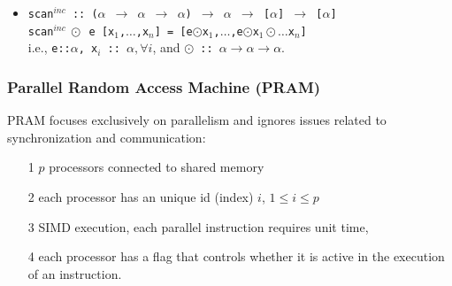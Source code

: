 \documentclass{beamer}
\renewcommand{\emph}[1]{\textcolor{structure}{#1}}
\newcommand{\emp}[1]{\textcolor{DikuRed}{ #1}}
\begin{document}
\begin{frame}[fragile,t]
\begin{itemize}
    \item \emp{{\tt scan$^{inc}$~::~($\alpha$~$\rightarrow$~$\alpha$~$\rightarrow$~$\alpha$)~$\rightarrow$~$\alpha$~$\rightarrow$~[$\alpha$]~$\rightarrow$~[$\alpha$]}}\\
        \emph{\tt scan$^{inc}~\odot$~e~[x$_1$,$\ldots$,x$_n$]~=~[e$\odot$x$_1$,$\ldots$,e$\odot$x$_1\odot\ldots$x$_{n}$]}\\
        i.e., \emp{{\tt{}e::$\alpha$, x$_i$~::~$\alpha, \forall i$}}, and 
        \emp{\tt $\odot$~::~$\alpha\rightarrow\alpha\rightarrow\alpha$}.

\end{itemize}

\end{frame}

\begin{frame}[fragile,t]
  \frametitle{Parallel Random Access Machine (PRAM)}

PRAM focuses exclusively on parallelism and ignores issues
related to synchronization and communication:
\begin{itemize}
    \item[1] $p$ processors connected to shared memory
    \item[2] each processor has an unique id (index) $i$, $1 \leq i \leq p$
    \item[3] SIMD execution, each parallel instruction requires unit time,
    \item[4] each processor has a flag that controls whether it is active
                in the execution of an instruction.
\end  {itemize}

\pause


\end{frame}
\end{document}
